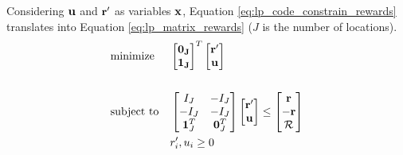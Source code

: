 \begin{appendices}
    Considering $\mathbf{u}$ and $\mathbf{r'}$ as variables $\mathbf{x}$, Equation \ref{eq:lp_code_constrain_rewards} translates into Equation \ref{eq:lp_matrix_rewards} ($J$ is the number of locations).
    \begin{equation} \label{eq:lp_matrix_rewards}
    \begin{aligned}
    & \text{minimize}
    & & \begin{bmatrix}
    \mathbf{0_J}\\
    \mathbf{1_J}\\
    \end{bmatrix}^T
    \begin{bmatrix}
    \mathbf{r'}\\
    \mathbf{u}
    \end{bmatrix}\\ \\
    & \text{subject to}
    & & \begin{bmatrix}
    I_J & -I_J\\
    -I_J & -I_J\\
    \mathbf{1}^T_J & \mathbf{0}^T_J\\
    \end{bmatrix}
    \begin{bmatrix}
    \mathbf{r'}\\
    \mathbf{u}\\
    \end{bmatrix} \leq
    \begin{bmatrix}
    \mathbf{r}\\
    -\mathbf{r}\\
    \mathcal{R}\\
    \end{bmatrix}\\
    &&& r'_i, u_i \geq 0
    \end{aligned}
    \end{equation}
    

\end{appendices}
